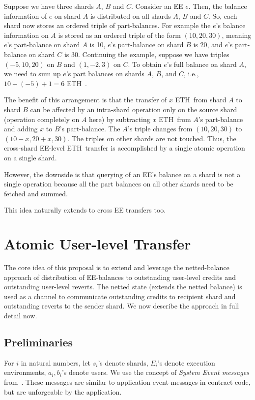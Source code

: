 \documentclass{article}
\newcommand{\eth}[0]{ETH~}
\begin{document}
Suppose we have three shards $A$, $B$ and $C$. Consider an EE $e$. Then, the balance information of $e$ on shard $A$ is distributed on all shards $A$, $B$ and $C$. So, each shard now stores an ordered triple of part-balances. For example the $e$'s balance information on $A$ is stored as an ordered triple of the form $(10, 20, 30)$, meaning $e$'s part-balance on shard $A$ is 10, $e$'s part-balance on shard $B$ is 20, and $e$'s part-balance on shard $C$ is 30. Continuing the example, suppose we have triples $(-5, 10, 20)$ on $B$ and $(1,-2,3)$ on $C$. To obtain $e$'s full balance on shard $A$, we need to sum up $e$'s part balances on shards $A$, $B$, and $C$, i.e., $10 + (-5) + 1 = 6$ \eth. 

The benefit of this arrangement is that the transfer of $x$ \eth from shard $A$ to shard $B$ can be affected by an intra-shard operation only on the source shard (operation completely on $A$ here) by subtracting $x$ \eth from $A$'s part-balance and adding $x$ to $B$'s part-balance. The $A$'s triple changes from $(10, 20, 30)$ to $(10-x, 20+x, 30)$. The triples on other shards are not touched. Thus, the cross-shard EE-level \eth transfer is accomplished by a single atomic operation on a single shard.

However, the downside is that querying of an EE's balance on a shard is not a single operation because all the part balances on all other shards need to be fetched and summed. 

This idea naturally extends to cross EE transfers too.

\section{Atomic User-level Transfer}
\label{sec:atomic-user}
The core idea of this proposal is to extend and leverage the netted-balance approach of distribution of EE-balances to outstanding user-level credits and outstanding user-level reverts. The netted state (extends the netted balance) is used as a channel to communicate outstanding credits to recipient shard and outstanding reverts to the sender shard. We now describe the approach in full detail now.

\subsection{Preliminaries}

For $i$ in natural numbers, let
$s_i$'s denote shards, 
$E_i$'s denote execution environments,
$a_i, b_i$'s denote users.
We use the concept of {\em System Event messages} from~\cite{peter-cross-shard}. These messages are similar to application event messages in contract code, but are unforgeable by the application. 
\end{document}
